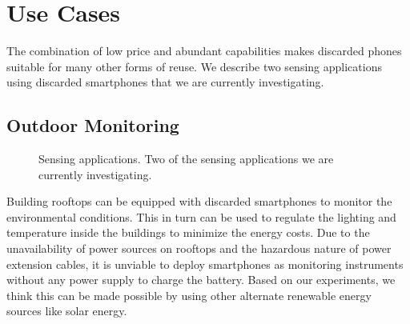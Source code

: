 \section{Use Cases}
\label{sec-usecases}
The combination of low price and abundant capabilities makes discarded phones
suitable for many other forms of reuse. 
We describe two sensing applications using discarded smartphones that we are
currently investigating.
\subsection{Outdoor Monitoring}
\label{sec-rooftop}
\begin{figure}[t]
  \centering
  \quad


  \vspace*{-0.1in}

  \caption{\small Sensing applications.
  \textnormal{Two of the sensing applications we are currently investigating.}}

  \vspace*{-0.1in}

\end{figure}
Building rooftops can be equipped with discarded smartphones to monitor the
environmental conditions. This in turn can be used to regulate the lighting and
temperature inside the buildings to minimize the energy costs.
Due to the unavailability of power sources on rooftops and the hazardous nature of
power extension cables, it is unviable to deploy smartphones as monitoring
instruments without any power supply to charge the battery.
Based on our experiments, we think this can be made possible by using other
alternate renewable energy sources like solar energy.

